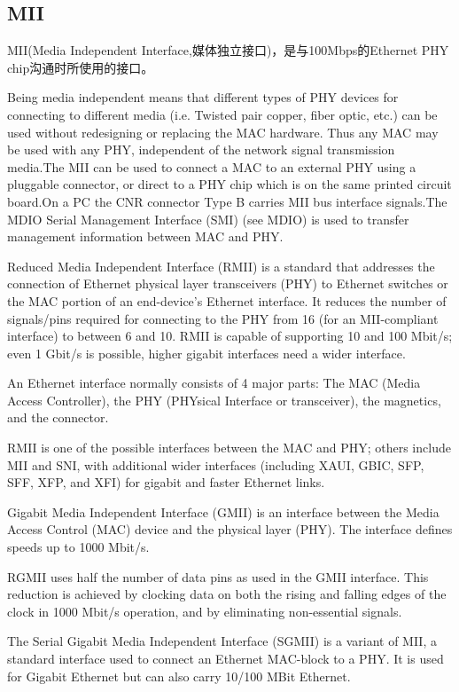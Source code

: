 \subsection{MII}
MII(Media Independent Interface,媒体独立接口)，是与100Mbps的Ethernet PHY chip沟通时所使用的接口。

Being media independent means that different types of PHY devices for connecting to different media (i.e. Twisted pair copper, fiber optic, etc.) can be used without redesigning or replacing the MAC hardware. Thus any MAC may be used with any PHY, independent of the network signal transmission media.The MII can be used to connect a MAC to an external PHY using a pluggable connector, or direct to a PHY chip which is on the same printed circuit board.On a PC the CNR connector Type B carries MII bus interface signals.The MDIO Serial Management Interface (SMI) (see MDIO) is used to transfer management information between MAC and PHY.

Reduced Media Independent Interface (RMII) is a standard that addresses the connection of Ethernet physical layer transceivers (PHY) to Ethernet switches or the MAC portion of an end-device's Ethernet interface. It reduces the number of signals/pins required for connecting to the PHY from 16 (for an MII-compliant interface) to between 6 and 10. RMII is capable of supporting 10 and 100 Mbit/s; even 1 Gbit/s is possible, higher gigabit interfaces need a wider interface.

An Ethernet interface normally consists of 4 major parts: The MAC (Media Access Controller), the PHY (PHYsical Interface or transceiver), the magnetics, and the connector.

RMII is one of the possible interfaces between the MAC and PHY; others include MII and SNI, with additional wider interfaces (including XAUI, GBIC, SFP, SFF, XFP, and XFI) for gigabit and faster Ethernet links.

Gigabit Media Independent Interface (GMII) is an interface between the Media Access Control (MAC) device and the physical layer (PHY). The interface defines speeds up to 1000 Mbit/s.

RGMII uses half the number of data pins as used in the GMII interface. This reduction is achieved by clocking data on both the rising and falling edges of the clock in 1000 Mbit/s operation, and by eliminating non-essential signals.

The Serial Gigabit Media Independent Interface (SGMII) is a variant of MII, a standard interface used to connect an Ethernet MAC-block to a PHY. It is used for Gigabit Ethernet but can also carry 10/100 MBit Ethernet.

